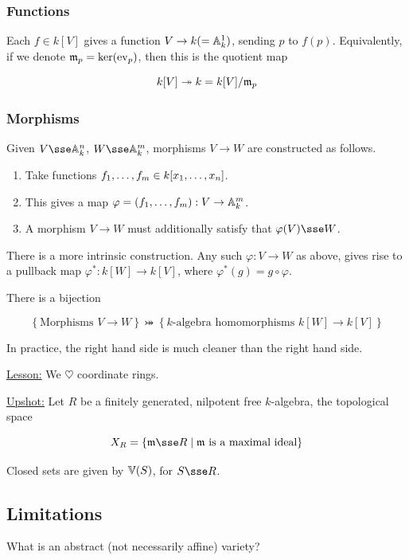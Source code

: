 \documentclass{article}
\newcommand{\set}[1]{\left\{#1\right\}}
\begin{document}
\subsubsection{Functions}

Each \(f \in k[V]\) gives a function \(V \to k (= \mathbb{A}_{k}^{1})\), sending \(p\) to \(f(p)\). Equivalently, if we denote \(\mathfrak{m}_p = \ker(\mathrm{ev}_p)\), then this is the quotient map

\[k[V] \twoheadrightarrow k = k[V]/\mathfrak{m}_p\]

\subsubsection{Morphisms}

Given \(V \sse \aff k n\), \(W \sse \aff k m\), morphisms \(V \to W\) are constructed as follows.

\begin{enumerate}
    \item Take functions \(f_1, \dots, f_m \in k[x_1, \dots, x_{n}]\).
    \item This gives a map \(\varphi = (f_1, \dots, f_m) : V \to \mathbb{A}_{k}^{m}\).
    \item A morphism \(V \to W\) must additionally satisfy that \(\varphi(V) \sse W\).
\end{enumerate}

There is a more intrinsic construction. Any such \(\varphi : V \to W\) as above, gives rise to a pullback map \(\varphi^* : k[W] \to k[V]\), where \(\varphi^*(g) = g \circ \varphi\).

There is a bijection

\[\set{\text{Morphisms }V \to W} \bij \set{k\text{-algebra homomorphisms }k[W] \to k[V]}\]

In practice, the right hand side is much cleaner than the right hand side.

\underline{Lesson:} We \(\heartsuit\) coordinate rings.

\underline{Upshot:} Let \(R\) be a finitely generated, nilpotent free \(k\)-algebra, the topological space

\[X_R = \left\{\mfm \sse R \mid \mfm \text{ is a maximal ideal}\right\}\]

Closed sets are given by \(\mathbb{V}(S)\), for \(S \sse R\).

\subsection{Limitations}

\begin{question}
    What is an abstract (not necessarily affine) variety?
\end{question}
\end{document}
